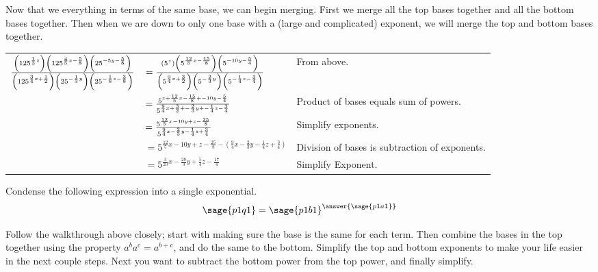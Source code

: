 \documentclass{ximera}
\begin{document}
\begin{example}
Now that we everything in terms of the same base, we can begin merging. First we merge all the top bases together and all the bottom bases together. Then when we are down to only one base with a (large and complicated) exponent, we will merge the top and bottom bases together.\\

\renewcommand{\arraystretch}{2.5}
\noindent\begin{tabular}{rll}
    $\frac{%
        \left(125^{\frac{1}{3}z}\right)\left(125^{\frac{4}{5}x-\frac{5}{8}}\right)\left(25^{-5y-\frac{5}{8}}\right)
        }%
        {
        \left(125^{\frac{3}{4}x+\frac{1}{2}}\right)\left(25^{-\frac{1}{3}y}\right)\left(25^{-\frac{1}{8}z-\frac{3}{8}}\right)
        }$
    & $=\frac{%
        \left(5^{z}\right)\left(5^{\frac{12}{5}x-\frac{15}{8}}\right)\left(5^{-10y-\frac{5}{4}}\right)
        }%
        {
        \left(5^{\frac{9}{4}x+\frac{3}{2}}\right)\left(5^{-\frac{2}{3}y}\right)\left(5^{-\frac{1}{4}z-\frac{3}{4}}\right)
        }$
    & From above.\\     
    & $=\frac{%
        5^{z+\frac{12}{5}x-\frac{15}{8}+-10y-\frac{5}{4}}
        }%
        {
        5^{\frac{9}{4}x+\frac{3}{2} + -\frac{2}{3}y + -\frac{1}{4}z-\frac{3}{4}}
        }$
    & Product of bases equals sum of powers.\\     
    & $=\frac{%
        5^{\frac{12}{5}x - 10y + z - \frac{25}{8}}
        }%
        {
        5^{\frac{9}{4}x - \frac{2}{3}y - \frac{1}{4}z + \frac{3}{4}}
        }$
    & Simplify exponents.\\
    & $= 5^{\frac{12}{5}x - 10y + z - \frac{25}{8} - \left(\frac{9}{4}x - \frac{2}{3}y - \frac{1}{4}z + \frac{3}{4}\right)}$
    & Division of bases is subtraction of exponents.\\
    & $= 5^{\frac{3}{20}x - \frac{28}{3}y + \frac{5}{4}z - \frac{17}{4}}$
    & Simplify Exponent.\\
\end{tabular}
\renewcommand{\arraystretch}{1}
\end{example}





\begin{problem}
    Condense the following expression into a single exponential.\\
    
    \[
        \sage{p1q1} = {\sage{p1b1}}^{\answer{\sage{p1a1}}}
    \]
    \begin{feedback}
        Follow the walkthrough above closely; start with making sure the base is the same for each term. Then combine the bases in the top together using the property $a^ba^c = a^{b+c}$, and do the same to the bottom. Simplify the top and bottom exponents to make your life easier in the next couple steps. Next you want to subtract the bottom power from the top power, and finally simplify.
    \end{feedback}
\end{problem}
\end{document}
